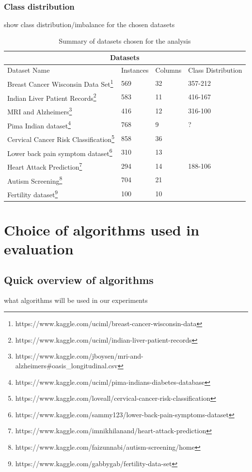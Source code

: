 \subsubsection{Class distribution}
show class distribution/imbalance for the chosen datasets
\begin{table}
\begin{tabular}{ |p{5cm}|p{1.5cm}| p{1.5cm} | p{2 cm}|}
 \hline
 \multicolumn{4}{|c|}{Datasets} \\
 \hline
 Dataset Name & Instances & Columns & Class Distribution \\
 \hline
 Breast Cancer Wisconsin Data Set\footnote{https://www.kaggle.com/uciml/breast-cancer-wisconsin-data}  & 569 & 32 & 
357-212\\
Indian Liver Patient Records\footnote{https://www.kaggle.com/uciml/indian-liver-patient-records} &  583 & 11  & 416-167 \\
MRI and Alzheimers\footnote{https://www.kaggle.com/jboysen/mri-and-alzheimers\#oasis\_longitudinal.csv} & 416 & 12 & 316-100\\
Pima Indian dataset\footnote{https://www.kaggle.com/uciml/pima-indians-diabetes-database} & 768 & 9  & ?\\
Cervical Cancer Risk Classification\footnote{https://www.kaggle.com/loveall/cervical-cancer-risk-classification  } & 858 &  36 & \\
Lower back pain symptom dataset\footnote{ https://www.kaggle.com/sammy123/lower-back-pain-symptoms-dataset} & 310 & 13  & \\
Heart Attack Prediction\footnote{https://www.kaggle.com/imnikhilanand/heart-attack-prediction} & 294 & 14  & 188-106\\
Autism Screening\footnote{https://www.kaggle.com/faizunnabi/autism-screening/home} &704 & 21 & \\
Fertility dataset\footnote{https://www.kaggle.com/gabbygab/fertility-data-set} &100  & 10 & \\
 \hline
\end{tabular}
\caption{Summary of datasets chosen for the analysis}
\label{table:1}
\end{table}

\section{Choice of algorithms used in evaluation}
\subsection{Quick overview of algorithms}
what algorithms will be used in our experiments
